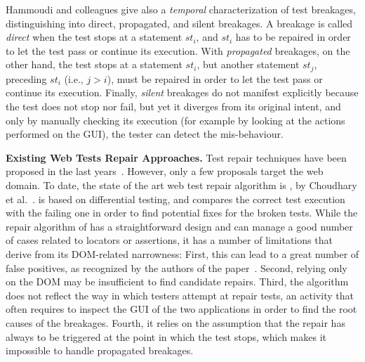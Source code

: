 Hammoudi and colleagues give also a \textit{temporal} characterization of test breakages, distinguishing into direct, propagated, and silent breakages. A breakage is called \textit{direct} when the test stops at a statement $st_i$, and $st_i$ has to be repaired in order to let the test pass or continue its execution. With \textit{propagated} breakages, on the other hand, the test stops at a statement $st_i$, but another statement $st_j$, preceding $st_i$ (i.e., $j > i$), must be repaired in order to let the test pass or continue its execution. Finally, \textit{silent} breakages do not manifest explicitly because the test does not stop nor fail, but yet it diverges from its original intent, and only by manually checking its execution (for example by looking at the actions performed on the GUI), the tester can detect the mis-behaviour.

\noindent
\textbf{Existing Web Tests Repair Approaches.} Test repair techniques have been proposed in the last years~\cite{Gao:2016:SGT:3046547.3046580,Daniel:2011:AGR:2002931.2002937,Daniel:2009:RSR:1747491.1747538,Daniel:2010:TRU:1831708.1831734,Choudhary:2011:WWA:2002931.2002935,Hammoudi-2016-FSE}. However, only a few proposals target the web domain. To date, the state of the art web test repair algorithm is \water, by Choudhary et al.~\cite{Choudhary:2011:WWA:2002931.2002935}. \water is based on differential testing, and compares the correct test execution with the failing one in order to find potential fixes for the broken tests. While the repair algorithm of \water has a straightforward design and can manage a good number of cases related to locators or assertions, it has a number of limitations that derive from its  DOM-related narrowness: First, this can lead to a great number of false positives, as recognized by the authors of the paper~\cite{Choudhary:2011:WWA:2002931.2002935}. Second, 
 relying only on the DOM may be insufficient to find candidate repairs. Third, the algorithm does not reflect the way in which testers attempt at repair tests, an activity that often requires to inspect the GUI of the two applications in order to find the root causes of the breakages. Fourth, it relies on the assumption that the repair has always to be triggered at the point in which the test stops, which makes it impossible to handle propagated breakages. %
 
